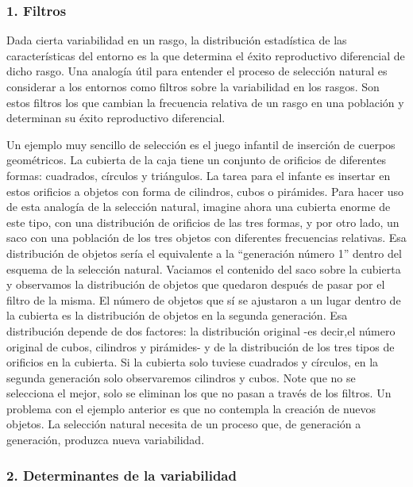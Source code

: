 \documentclass[
  a4paper,
  DIV=11,
  numbers=noendperiod]{scrreprt}
\begin{document}
\subsubsection{1. Filtros}\label{filtros}

Dada cierta variabilidad en un rasgo, la distribución estadística de las
características del entorno es la que determina el éxito reproductivo
diferencial de dicho rasgo. Una analogía útil para entender el proceso
de selección natural es considerar a los entornos como filtros sobre la
variabilidad en los rasgos. Son estos filtros los que cambian la
frecuencia relativa de un rasgo en una población y determinan su éxito
reproductivo diferencial.

Un ejemplo muy sencillo de selección es el juego infantil de inserción
de cuerpos geométricos. La cubierta de la caja tiene un conjunto de
orificios de diferentes formas: cuadrados, círculos y triángulos. La
tarea para el infante es insertar en estos orificios a objetos con forma
de cilindros, cubos o pirámides. Para hacer uso de esta analogía de la
selección natural, imagine ahora una cubierta enorme de este tipo, con
una distribución de orificios de las tres formas, y por otro lado, un
saco con una población de los tres objetos con diferentes frecuencias
relativas. Esa distribución de objetos sería el equivalente a la
``generación número 1'' dentro del esquema de la selección natural.
Vaciamos el contenido del saco sobre la cubierta y observamos la
distribución de objetos que quedaron después de pasar por el filtro de
la misma. El número de objetos que sí se ajustaron a un lugar dentro de
la cubierta es la distribución de objetos en la segunda generación. Esa
distribución depende de dos factores: la distribución original -es
decir,el número original de cubos, cilindros y pirámides- y de la
distribución de los tres tipos de orificios en la cubierta. Si la
cubierta solo tuviese cuadrados y círculos, en la segunda generación
solo observaremos cilindros y cubos. Note que no se selecciona el mejor,
solo se eliminan los que no pasan a través de los filtros. Un problema
con el ejemplo anterior es que no contempla la creación de nuevos
objetos. La selección natural necesita de un proceso que, de generación
a generación, produzca nueva variabilidad.

\subsubsection{2. Determinantes de la
variabilidad}\label{determinantes-de-la-variabilidad}
\end{document}
